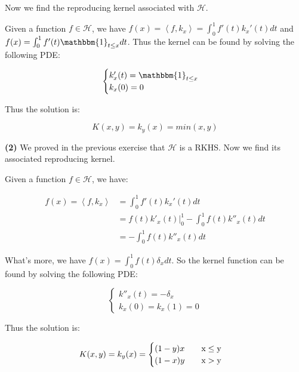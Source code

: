 \documentclass[11pt]{article}
\begin{document}
    Now we find the reproducing kernel associated with $\mathcal{H}$.

    Given a function $f \in \mathcal{H}$, we have $f(x) = \left \langle f, k_x \right \rangle = \int_0^1 f'(t) k_x'(t) dt$ and $f(x) = \int_0^1 f'(t) \mathbbm{1}_{t \le x} dt$. 
    Thus the kernel can be found by solving the following PDE:

    \vspace{-2em}
    $$
    \begin{cases} 
      k'_x(t) = \mathbbm{1}_{t \le x} \\
      k_x (0) = 0
    \end{cases}
    $$
    \vspace{-2em}

    Thus the solution is:

    \vspace{-2em}
    $$
    K(x, y) = k_y (x) = min(x, y)
    $$
    \vspace{-2em}

    \textbf{(2)} We proved in the previous exercise that $\mathcal{H}$ is a RKHS. Now we find its associated reproducing kernel.

    Given a function $f \in \mathcal{H}$, we have:

    \vspace{-4em}
    \begin{align*}
      f(x) = \left \langle f, k_x \right \rangle &= \int_0^1 f'(t) k_x'(t) dt \\
      &= f(t)k'_x(t) \Big |_0^1 - \int_0^1 f(t) k''_x(t)dt \\
      &= -\int_0^1 f(t)k''_x(t) dt
    \end{align*}
    \vspace{-4em}

    What's more, we have $f(x) = \int_0^1 f(t) \delta_x dt$. So the kernel function can be found by solving the following PDE:
    
    \vspace{-2em}
    $$
    \begin{cases} 
      k''_x(t) = -\delta_x \\
      k_x (0) = k_x(1) = 0
    \end{cases}
    $$
    \vspace{-2em}

    Thus the solution is:

    \vspace{-2em}
    $$
    K(x, y) = k_y (x) =
    \begin{cases} 
      (1 - y) x \mbox{\quad \quad x} \le \mbox{y} \\
      (1 - x) y \mbox{\quad \quad x} > \mbox{y}
    \end{cases}
    $$
    \vspace{-2em}
\end{document}
